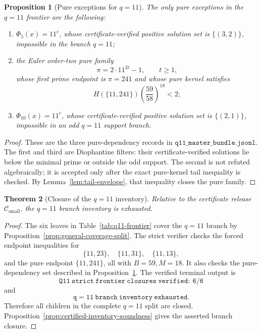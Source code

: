 \documentclass[11pt]{article}
\newtheorem{theorem}{Theorem}[section]
\newtheorem{proposition}[theorem]{Proposition}
\theoremstyle{definition}
\theoremstyle{remark}
\newcommand{\Hfun}{H}
\newcommand{\Csmall}{\ensuremath{\mathcal C_{\mathrm{small}}}}
\begin{document}
\begin{proposition}[Pure exceptions for \(q=11\)]
\label{prop:q11-pure}
The only pure exceptions in the \(q=11\) frontier are the following:
\begin{enumerate}[label=(\roman*),leftmargin=2.2em]
\item \(\Phi_5(x)=11^c\), whose certificate-verified positive solution set is
\(\{(3,2)\}\), impossible in the branch \(q=11\);
\item the Euler order-two pure family
\[
  \pi=2\cdot 11^{2t}-1,\qquad t\ge1,
\]
whose first prime endpoint is \(\pi=241\) and whose pure kernel satisfies
\[
  \Hfun(\{11,241\})\left(\frac{59}{58}\right)^{18}<2;
\]
\item \(\Phi_{10}(x)=11^c\), whose certificate-verified positive solution set is
\(\{(2,1)\}\), impossible in an odd \(q=11\) support branch.
\end{enumerate}
\end{proposition}

\begin{proof}
These are the three pure-dependency records in
\(\texttt{q11\_master\_bundle.jsonl}\).  The first and third are Diophantine
filters: their certificate-verified solutions lie below the minimal prime or outside the
odd support.  The second is not refuted algebraically; it is accepted only
after the exact pure-kernel tail inequality is checked.  By
Lemma~\ref{lem:tail-envelope}, that inequality closes the pure family.
\end{proof}

\begin{theorem}[Closure of the \(q=11\) inventory]
\label{thm:q11-closed}
Relative to the certificate release \(\Csmall\), the \(q=11\) branch inventory is
exhausted.
\end{theorem}

\begin{proof}
The six leaves in Table~\ref{tab:q11-frontier} cover the \(q=11\) branch by
Proposition~\ref{prop:general-coverage-split}.  The strict verifier checks the
forced endpoint inequalities for
\[
  \{11,23\},\quad \{11,31\},\quad \{11,13\},
\]
and the pure endpoint \(\{11,241\}\), all with \(B=59,M=18\).  It also checks
the pure-dependency set described in Proposition~\ref{prop:q11-pure}.  The
verified terminal output is
\[
  \mathtt{Q11\ strict\ frontier\ closures\ verified:\ 6/6}
\]
and
\[
  \mathtt{q=11\ branch\ inventory\ exhausted}.
\]
Therefore all children in the complete \(q=11\) split are closed.
Proposition~\ref{prop:certified-inventory-soundness} gives the asserted
branch closure.
\end{proof}
\end{document}
